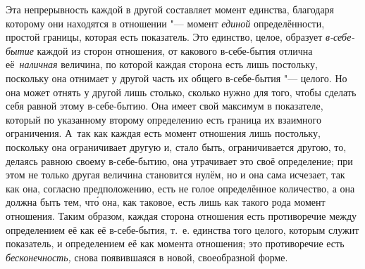 Эта непрерывность каждой в другой составляет момент единства, благодаря
которому они находятся в отношении "--- момент {\em единой} определённости,
простой границы, которая есть показатель. Это единство, целое, образует
{\em в-себе-бытие} каждой из сторон отношения, от какового в-себе-бытия отлична
её~{\em наличная} величина, по которой каждая сторона есть лишь постольку,
поскольку она отнимает у другой часть их общего в-себе-бытия "--- целого. Но
она может отнять у другой лишь столько, сколько нужно для того, чтобы сделать
себя равной этому в-себе-бытию. Она имеет свой максимум в показателе, который
по указанному второму определению есть граница их взаимного ограничения. А~так
как каждая есть момент отношения лишь постольку, поскольку она ограничивает
другую и, стало быть, ограничивается другою, то, делаясь равною своему
в-себе-бытию, она утрачивает это своё определение; при этом не только другая
величина становится нулём, но и она сама
исчезает, так как она, согласно предположению, есть не голое определённое
количество, а она должна быть тем, чт\'{о} она, как таковое, есть лишь как
такого рода момент отношения. Таким образом, каждая сторона отношения есть
противоречие между определением её как её в-себе-бытия, т.~е. единства того
целого, которым служит показатель, и определением её как момента отношения; это
противоречие есть {\em бесконечность,} снова появившаяся в новой, своеобразной
форме.

